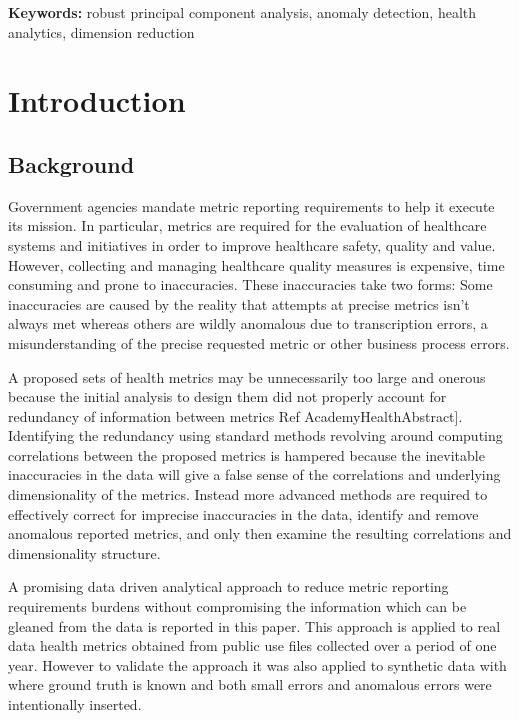 \documentclass[conference]{IEEEtran}
\begin{document}
{\bf Keywords:} robust principal component analysis, anomaly
detection, health analytics, dimension reduction

\section{Introduction}

\subsection{Background}
Government agencies  mandate  metric reporting requirements to help it execute its mission.  In particular,  metrics are required for the evaluation of healthcare systems and initiatives in order to improve healthcare safety, quality and value. However, collecting and managing healthcare quality measures is expensive,  time consuming and prone to inaccuracies. These inaccuracies take two forms: Some inaccuracies are caused by the reality that attempts at precise metrics isn't always met whereas others  are wildly anomalous due to transcription errors, a misunderstanding of the precise requested metric or other business process errors.

A  proposed sets of health metrics may be unnecessarily too large and onerous because the initial analysis to design them did not properly account for redundancy of information between metrics
Ref AcademyHealthAbstract]. Identifying the redundancy  using standard methods revolving around computing correlations between the proposed metrics is hampered because the inevitable inaccuracies in the data will give a false sense of the correlations and underlying dimensionality of the metrics.   Instead more advanced methods are required to effectively correct for imprecise inaccuracies in the data, identify and remove anomalous reported metrics, and only then examine the resulting correlations and dimensionality structure.

A promising data driven analytical approach to reduce metric reporting requirements burdens without compromising the information which can be gleaned from the data is reported in this paper. This approach is applied to real data health metrics obtained from public use files  collected over a period of one year.  However to validate the approach it was also applied  to synthetic 
  data with where ground truth is known and both small errors and anomalous errors were  intentionally inserted. 
\end{document}
